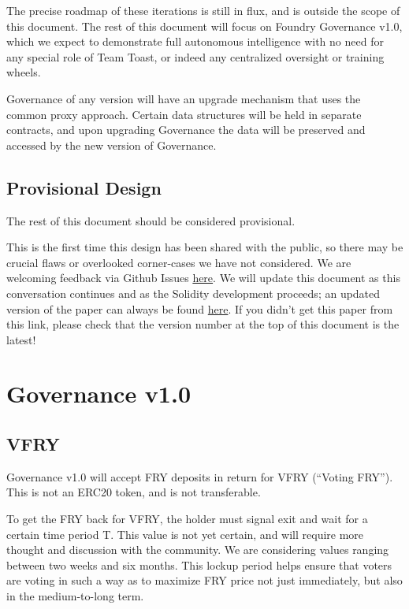 \documentclass{article}
\begin{document}
The precise roadmap of these iterations is still in flux, and is outside the scope of this document. The rest of this document will focus on Foundry Governance v1.0, which we expect to demonstrate full autonomous intelligence with no need for any special role of Team Toast, or indeed any centralized oversight or training wheels.

Governance of any version will have an upgrade mechanism that uses the common proxy approach. Certain data structures will be held in separate contracts, and upon upgrading Governance the data will be preserved and accessed by the new version of Governance.

\subsection{Provisional Design} \label{provisional}

The rest of this document should be considered provisional.

This is the first time this design has been shared with the public, so there may be crucial flaws or overlooked corner-cases we have not considered. We are welcoming feedback via Github Issues \href{https://github.com/burnable-tech/foundry-papers}{here}. We will update this document as this conversation continues and as the Solidity development proceeds; an updated version of the paper can always be found \href{https://github.com/burnable-tech/foundry-papers/releases}{here}. If you didn't get this paper from this link, please check that the version number at the top of this document is the latest!

\section{Governance v1.0} \label{governance}

\subsection{VFRY} \label{vfry}

Governance v1.0 will accept FRY deposits in return for VFRY (``Voting FRY''). This is not an ERC20 token, and is not transferable.

To get the FRY back for VFRY, the holder must signal exit and wait for a certain time period T. This value is not yet certain, and will require more thought and discussion with the community. We are considering values ranging between two weeks and six months. This lockup period helps ensure that voters are voting in such a way as to maximize FRY price not just immediately, but also in the medium-to-long term.
\end{document}
